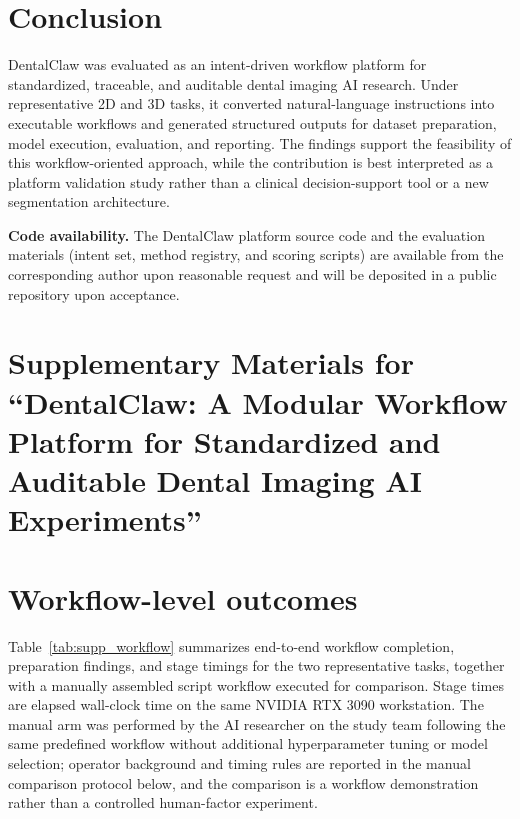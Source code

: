 \documentclass[final,5p,times,twocolumn]{elsarticle}
\begin{document}
\section{Conclusion}
DentalClaw was evaluated as an intent-driven workflow platform for standardized, traceable, and auditable dental imaging AI research. Under representative 2D and 3D tasks, it converted natural-language instructions into executable workflows and generated structured outputs for dataset preparation, model execution, evaluation, and reporting. The findings support the feasibility of this workflow-oriented approach, while the contribution is best interpreted as a platform validation study rather than a clinical decision-support tool or a new segmentation architecture.

\noindent\textbf{Code availability.} The DentalClaw platform source code and the evaluation materials (intent set, method registry, and scoring scripts) are available from the corresponding author upon reasonable request and will be deposited in a public repository upon acceptance.

\newpage
\footnotesize



\clearpage
\onecolumn
\appendix
\setcounter{table}{0}
\renewcommand{\thetable}{S\arabic{table}}
\setcounter{figure}{0}
\renewcommand{\thefigure}{S\arabic{figure}}

\section*{Supplementary Materials for ``DentalClaw: A Modular Workflow Platform for Standardized and Auditable Dental Imaging AI Experiments''}

\section{Workflow-level outcomes}

Table~\ref{tab:supp_workflow} summarizes end-to-end workflow completion, preparation findings, and stage timings for the two representative tasks, together with a manually assembled script workflow executed for comparison. Stage times are elapsed wall-clock time on the same NVIDIA RTX 3090 workstation. The manual arm was performed by the AI researcher on the study team following the same predefined workflow without additional hyperparameter tuning or model selection; operator background and timing rules are reported in the manual comparison protocol below, and the comparison is a workflow demonstration rather than a controlled human-factor experiment.
\end{document}
